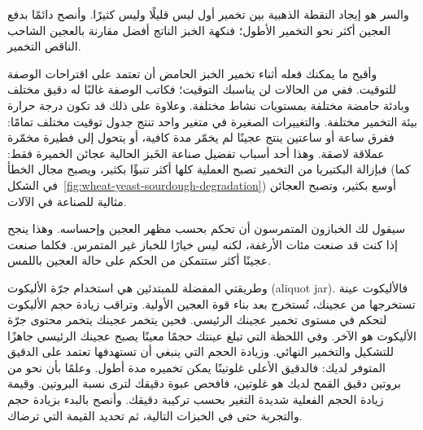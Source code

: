 والسر هو إيجاد النقطة الذهبية بين تخمير أول ليس قليلًا وليس كثيرًا. وأنصح دائمًا بدفع العجين أكثر نحو التخمير الأطول؛ فنكهة الخبز الناتج أفضل مقارنة بالعجين الشاحب الناقص التخمير.

\begin{table}[htb]
    \centering
        \caption[مراحل التخمير الحامض]{المراحل المختلفة للتخمير الحامض وآثارها في اللُّبّ والفتحات والقوام والمذاق الكلي.}
\end{table}

وأقبح ما يمكنك فعله أثناء تخمير الخبز الحامض أن تعتمد على اقتراحات الوصفة للتوقيت. ففي  من الحالات لن يناسبك التوقيت؛ فكاتب الوصفة غالبًا له دقيق مختلف وبادئة حامضة مختلفة بمستويات نشاط مختلفة. وعلاوة على ذلك قد تكون درجة حرارة بيئة التخمير مختلفة. والتغييرات الصغيرة في متغير واحد تنتج جدول توقيت مختلف تمامًا: ففرق ساعة أو ساعتين ينتج عجينًا لم يخمّر مدة كافية، أو يتحول إلى فطيرة مخمّرة عملاقة لاصقة. وهذا أحد أسباب تفضيل صناعة الخَبز الحالية عجائن الخميرة فقط: فبإزالة البكتيريا من التخمير تصبح العملية كلها أكثر تنبؤًا بكثير، ويصبح مجال الخطأ (كما في الشكل~\ref{fig:wheat-yeast-sourdough-degradation}) أوسع بكثير، وتصبح العجائن مثالية للصناعة في الآلات.

\begin{flowchart}[!htb]
  \centering
  
  \caption[عملية فحص التخمير الأول]{أثناء التخمير الأول تُخمَّر عجائن متعددة معًا في كتلة. ومن الجوانب الصعبة في صنع الخبز الحامض المنزلي تحديد متى تكتمل مرحلة التخمير هذه. ويوضح هذا المخطط خيارات متعددة متاحة لفحص سير التخمير الأول.}
  \label{fig:bulk-fermentation}
\end{flowchart}

سيقول لك الخبازون المتمرسون أن تحكم بحسب مظهر العجين وإحساسه. وهذا ينجح إذا كنت قد صنعت مئات الأرغفة، لكنه ليس خيارًا للخباز غير المتمرس. فكلما صنعت عجينًا أكثر ستتمكن من الحكم على حالة العجين باللمس.

وطريقتي المفضلة للمبتدئين هي استخدام جرّة الأليكوت \textenglish{(aliquot jar)}. فالأليكوت عينة تستخرجها من عجينك، تُستخرج بعد بناء قوة العجين الأولية. وتراقب زيادة حجم الأليكوت لتحكم في مستوى تخمير عجينك الرئيسي. فحين يتخمر عجينك يتخمر محتوى جرّة الأليكوت هو الآخر. وفي اللحظة التي تبلغ عينتك حجمًا معينًا يصبح عجينك الرئيسي جاهزًا للتشكيل والتخمير النهائي. وزيادة الحجم التي ينبغي أن تستهدفها تعتمد على الدقيق المتوفر لديك: فالدقيق الأعلى غلوتينًا يمكن تخميره مدة أطول. وعلمًا بأن نحو  من بروتين دقيق القمح لديك هو غلوتين، فافحص عبوة دقيقك لترى نسبة البروتين. وقيمة زيادة الحجم الفعلية شديدة التغير بحسب تركيبة دقيقك. وأنصح بالبدء بزيادة حجم  والتجربة حتى  في الخبزات التالية، ثم تحديد القيمة التي ترضاك.

